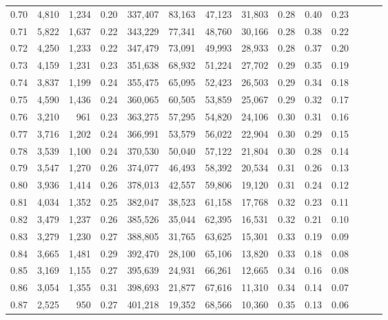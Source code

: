 \begin{tabular}{rrrrrrrrrrrrrr}
0.70 &   4,810 &  1,234 &  0.20 &  337,407 &   83,163 &  47,123 &  31,803 &  0.28 &  0.40 &      0.23 \\
0.71 &   5,822 &  1,637 &  0.22 &  343,229 &   77,341 &  48,760 &  30,166 &  0.28 &  0.38 &      0.22 \\
0.72 &   4,250 &  1,233 &  0.22 &  347,479 &   73,091 &  49,993 &  28,933 &  0.28 &  0.37 &      0.20 \\
0.73 &   4,159 &  1,231 &  0.23 &  351,638 &   68,932 &  51,224 &  27,702 &  0.29 &  0.35 &      0.19 \\
0.74 &   3,837 &  1,199 &  0.24 &  355,475 &   65,095 &  52,423 &  26,503 &  0.29 &  0.34 &      0.18 \\
0.75 &   4,590 &  1,436 &  0.24 &  360,065 &   60,505 &  53,859 &  25,067 &  0.29 &  0.32 &      0.17 \\
0.76 &   3,210 &    961 &  0.23 &  363,275 &   57,295 &  54,820 &  24,106 &  0.30 &  0.31 &      0.16 \\
0.77 &   3,716 &  1,202 &  0.24 &  366,991 &   53,579 &  56,022 &  22,904 &  0.30 &  0.29 &      0.15 \\
0.78 &   3,539 &  1,100 &  0.24 &  370,530 &   50,040 &  57,122 &  21,804 &  0.30 &  0.28 &      0.14 \\
0.79 &   3,547 &  1,270 &  0.26 &  374,077 &   46,493 &  58,392 &  20,534 &  0.31 &  0.26 &      0.13 \\
0.80 &   3,936 &  1,414 &  0.26 &  378,013 &   42,557 &  59,806 &  19,120 &  0.31 &  0.24 &      0.12 \\
0.81 &   4,034 &  1,352 &  0.25 &  382,047 &   38,523 &  61,158 &  17,768 &  0.32 &  0.23 &      0.11 \\
0.82 &   3,479 &  1,237 &  0.26 &  385,526 &   35,044 &  62,395 &  16,531 &  0.32 &  0.21 &      0.10 \\
0.83 &   3,279 &  1,230 &  0.27 &  388,805 &   31,765 &  63,625 &  15,301 &  0.33 &  0.19 &      0.09 \\
0.84 &   3,665 &  1,481 &  0.29 &  392,470 &   28,100 &  65,106 &  13,820 &  0.33 &  0.18 &      0.08 \\
0.85 &   3,169 &  1,155 &  0.27 &  395,639 &   24,931 &  66,261 &  12,665 &  0.34 &  0.16 &      0.08 \\
0.86 &   3,054 &  1,355 &  0.31 &  398,693 &   21,877 &  67,616 &  11,310 &  0.34 &  0.14 &      0.07 \\
0.87 &   2,525 &    950 &  0.27 &  401,218 &   19,352 &  68,566 &  10,360 &  0.35 &  0.13 &      0.06 \\

\end{tabular}
